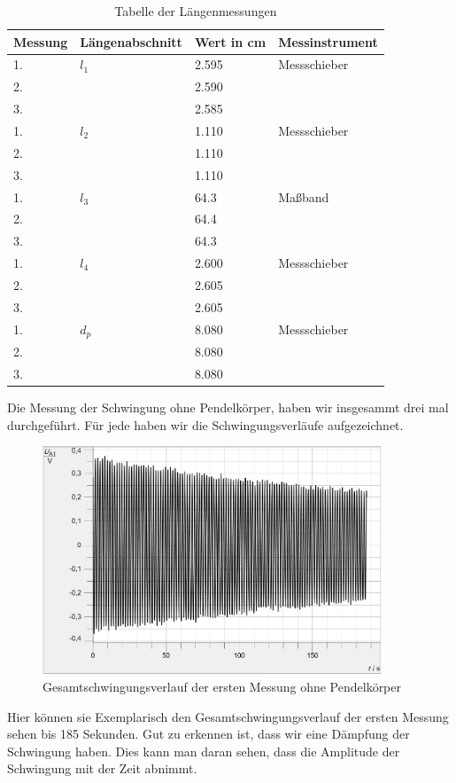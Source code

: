 \documentclass[twoside]{protokoll}
\begin{document}
\begin{table}[H]
        \centering
        \begin{tabularx}{1.0\textwidth}{X l X X} %
            \toprule
            \textbf{Messung} & \textbf{Längenabschnitt} & \textbf{Wert in cm} & \textbf{Messinstrument} \\
            \midrule
            1. & $l_1$ & 2.595 & Messschieber \\
            2. & & 2.590 &\\ 
            3. & & 2.585 &\\
            \midrule
            1. & $l_2$ & 1.110 & Messschieber \\
            2. & & 1.110 &\\
            3. & & 1.110 &\\
            \midrule
            1. & $l_3$ & 64.3 & Maßband \\
            2. & & 64.4 &\\
            3. & & 64.3 &\\
            \midrule
            1. & $l_4$ & 2.600 & Messschieber \\
            2. & & 2.605 &\\
            3. & & 2.605 &\\
            \midrule
            1. & $d_p$ & 8.080 & Messschieber \\
            2. & & 8.080 &\\
            3. & & 8.080 &\\
            \bottomrule
        \end{tabularx}
        \caption{Tabelle der Längenmessungen}
        \label{tab:längen}
    \end{table}
     
Die Messung der Schwingung ohne Pendelkörper, haben wir insgesammt drei mal durchgeführt.
Für jede haben wir die Schwingungsverläufe aufgezeichnet.
\begin{figure}[H]
    \centering
    \includegraphics[width=0.9\textwidth]{plots/stange-1-komplett.pdf}
    \caption{Gesamtschwingungsverlauf der ersten Messung ohne Pendelkörper}
\end{figure}
Hier können sie Exemplarisch den Gesamtschwingungsverlauf der ersten Messung sehen bis 185 Sekunden.
Gut zu erkennen ist, dass wir eine Dämpfung der Schwingung haben.
Dies kann man daran sehen, dass die Amplitude der Schwingung mit der Zeit abnimmt. 
\end{document}
